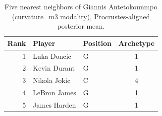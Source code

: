 \begin{table}[htbp]
  \centering\small
  \begin{tabular}{rllc}
    \toprule
    Rank & Player & Position & Archetype \\
    \midrule
    1 & Luka Doncic & G & 1 \\
    2 & Kevin Durant & G & 1 \\
    3 & Nikola Jokic & C & 4 \\
    4 & LeBron James & G & 1 \\
    5 & James Harden & G & 1 \\
    \bottomrule
  \end{tabular}
  \caption{Five nearest neighbors of Giannis Antetokounmpo (curvature_m3 modality), Procrustes-aligned posterior mean.}
  \label{tab:Giannis_Antetokounmpo_neighbors_curvature_m3}
\end{table}

